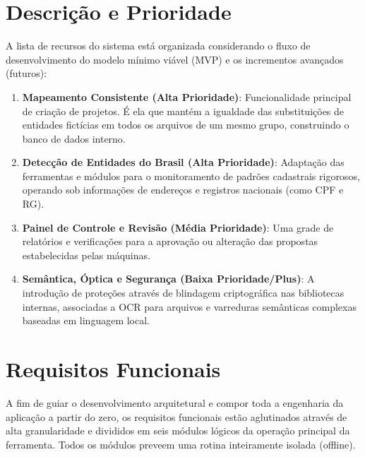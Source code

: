 \documentclass{scrreprt}
\begin{document}
\section{Descrição e Prioridade}
A lista de recursos do sistema está organizada considerando o fluxo de desenvolvimento do modelo mínimo viável (MVP) e os incrementos avançados (futuros):
\begin{enumerate}
    \item \textbf{Mapeamento Consistente (Alta Prioridade)}: Funcionalidade principal de criação de projetos. É ela que mantém a igualdade das substituições de entidades fictícias em todos os arquivos de um mesmo grupo, construindo o banco de dados interno.
    \item \textbf{Detecção de Entidades do Brasil (Alta Prioridade)}: Adaptação das ferramentas e módulos para o monitoramento de padrões cadastrais rigorosos, operando sob informações de endereços e registros nacionais (como CPF e RG).
    \item \textbf{Painel de Controle e Revisão (Média Prioridade)}: Uma grade de relatórios e verificações para a aprovação ou alteração das propostas estabelecidas pelas máquinas.
    \item \textbf{Semântica, Óptica e Segurança (Baixa Prioridade/Plus)}: A introdução de proteções através de blindagem criptográfica nas bibliotecas internas, associadas a OCR para arquivos e varreduras semânticas complexas baseadas em linguagem local.
\end{enumerate}

\section{Requisitos Funcionais}
A fim de guiar o desenvolvimento arquitetural e compor toda a engenharia da aplicação a partir do zero, os requisitos funcionais estão aglutinados através de alta granularidade e divididos em seis módulos lógicos da operação principal da ferramenta. Todos os módulos preveem uma rotina inteiramente isolada (offline).
\end{document}
